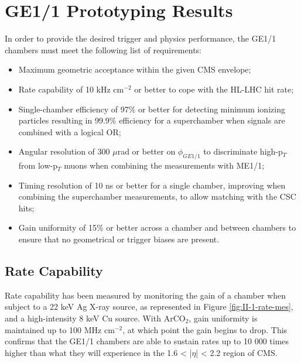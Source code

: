   \section{GE1/1 Prototyping Results}

    In order to provide the desired trigger and physics performance, the GE1/1 chambers must meet the following list of requirements:
    \begin{itemize}
      \item Maximum geometric acceptance within the given CMS envelope;
      \item Rate capability of 10 kHz cm$^{-2}$ or better to cope with the HL-LHC hit rate;
      \item Single-chamber efficiency of 97\% or better for detecting minimum ionizing particles resulting in 99.9\% efficiency for a superchamber when signals are combined with a logical OR;
      \item Angular resolution of 300 $\mu$rad or better on $ \phi_{GE1/1} $ to discriminate high-p$_T$ from low-p$_T$ muons when combining the measurements with ME1/1;
      \item Timing resolution of 10 ns or better for a single chamber, improving when combining the superchamber measurements, to allow matching with the CSC hits;
      \item Gain uniformity of 15\% or better across a chamber and between chambers to ensure that no geometrical or trigger biases are present. \\
    \end{itemize}

    \subsection{Rate Capability}

      Rate capability has been measured by monitoring the gain of a chamber when subject to a 22 keV Ag X-ray source, as represented in Figure \ref{fig:II-1-rate-mes}, and a high-intensity 8 keV Cu source. With ArCO$_2$, gain uniformity is maintained up to 100 MHz cm$^{-2}$, at which point the gain begins to drop. This confirms that the GE1/1 chambers are able to sustain rates up to 10 000 times higher than what they will experience in the 1.6 < |$\eta$| < 2.2 region of CMS. \\

